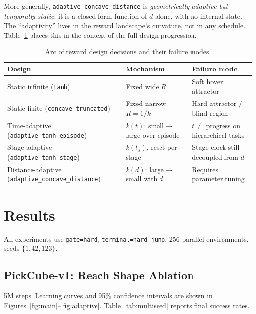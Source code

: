 \documentclass{article}
\begin{document}
More generally, \texttt{adaptive\_concave\_distance} is \emph{geometrically adaptive
but temporally static}: it is a closed-form function of $d$ alone, with no internal
state. The ``adaptivity'' lives in the reward landscape's curvature, not in any
schedule. Table~\ref{tab:design-arc} places this in the context of the full design
progression.

\begin{table}[h]
\centering
\small
\caption{Arc of reward design decisions and their failure modes.}
\label{tab:design-arc}
\begin{tabular}{@{}lll@{}}
\toprule
\textbf{Design} & \textbf{Mechanism} & \textbf{Failure mode} \\
\midrule
Static infinite (\texttt{tanh})            & Fixed wide $R$            & Soft hover attractor \\
Static finite (\texttt{concave\_truncated})& Fixed narrow $R=1/k$      & Hard attractor / blind region \\
Time-adaptive (\texttt{adaptive\_tanh\_episode}) & $k(t)$: small$\to$large over episode & $t \neq$ progress on hierarchical tasks \\
Stage-adaptive (\texttt{adaptive\_tanh\_stage})  & $k(t_s)$, reset per stage & Stage clock still decoupled from $d$ \\
Distance-adaptive (\texttt{adaptive\_concave\_distance}) & $k(d)$: large$\to$small with $d$ & Requires parameter tuning \\
\bottomrule
\end{tabular}
\end{table}

\section{Results}
\label{sec:results}

All experiments use \texttt{gate=hard}, \texttt{terminal=hard\_jump},
256 parallel environments, seeds $\{1, 42, 123\}$.

\subsection{PickCube-v1: Reach Shape Ablation}
\label{sec:pickcube}

5M steps. Learning curves and 95\% confidence intervals are shown in
Figures~\ref{fig:main}--\ref{fig:adaptive}.
Table~\ref{tab:multiseed} reports final success rates.
\end{document}
